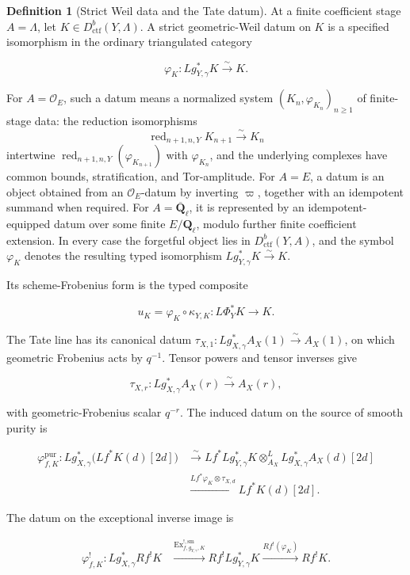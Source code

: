 \documentclass[10pt]{article}
\theoremstyle{definition}
\newtheorem{definition}[theorem]{Definition}
\newcommand{\Ql}{\mathbf Q_\ell}
\newcommand{\Qlb}{\overline{\mathbf Q}_\ell}
\newcommand{\OO}{\mathcal O}
\newcommand{\Dctf}{D^b_{\mathrm{ctf}}}
\newcommand{\red}{\operatorname{red}}
\begin{document}
\begin{definition}[Strict Weil data and the Tate datum]
At a finite coefficient stage \(A=\Lambda\), let
\(K\in\Dctf(Y,\Lambda)\).  A strict geometric-Weil datum on \(K\) is a
specified isomorphism in the ordinary triangulated category

\[
 \varphi_K:Lg_{Y,\gamma}^*K\xrightarrow{\sim}K.
\]

For \(A=\OO_E\), such a datum means a normalized system
\((K_n,\varphi_{K_n})_{n\geq1}\) of finite-stage data: the reduction
isomorphisms
\[
 \red_{n+1,n,Y}K_{n+1}\xrightarrow{\sim}K_n
\]
intertwine \(\red_{n+1,n,Y}(\varphi_{K_{n+1}})\) with
\(\varphi_{K_n}\), and the underlying complexes have common bounds,
stratification, and Tor-amplitude.  For \(A=E\), a datum is an object obtained
from an \(\OO_E\)-datum by inverting \(\varpi\), together with an idempotent
summand when required.  For \(A=\Qlb\), it is represented by an
idempotent-equipped datum over some finite \(E/\Ql\), modulo further finite
coefficient extension.  In every case the forgetful object lies in
\(\Dctf(Y,A)\), and the symbol \(\varphi_K\) denotes the resulting typed
isomorphism \(Lg_{Y,\gamma}^*K\xrightarrow{\sim}K\).

Its scheme-Frobenius form is the typed composite

\[
 u_K=\varphi_K\circ\kappa_{Y,K}:
 L\Phi_Y^*K\longrightarrow K.
\]

The Tate line has its canonical datum
\(\tau_{X,1}:Lg_{X,\gamma}^*A_X(1)\xrightarrow{\sim}A_X(1)\), on which
geometric Frobenius acts by \(q^{-1}\).  Tensor powers and tensor inverses
give

\[
 \tau_{X,r}:Lg_{X,\gamma}^*A_X(r)\xrightarrow{\sim}A_X(r),
\]

with geometric-Frobenius scalar \(q^{-r}\).  The induced datum on the
source of smooth purity is

\[
\begin{aligned}
 \varphi^{\mathrm{pur}}_{f,K}:
 Lg_{X,\gamma}^*\bigl(Lf^*K(d)[2d]\bigr)
 &\xrightarrow{\sim}
 Lf^*Lg_{Y,\gamma}^*K\otimes_{A_X}^L
 Lg_{X,\gamma}^*A_X(d)[2d]\\
 &\xrightarrow{Lf^*\varphi_K\otimes\tau_{X,d}}
 Lf^*K(d)[2d].
\end{aligned}
\]

The datum on the exceptional inverse image is

\[
\begin{aligned}
 \varphi^!_{f,K}:Lg_{X,\gamma}^*Rf^!K
 &\xrightarrow{\operatorname{Ex}^{!,\mathrm{sm}}_{f,g_{Y,\gamma},K}}
 Rf^!Lg_{Y,\gamma}^*K
 \xrightarrow{Rf^!(\varphi_K)}Rf^!K.
\end{aligned}
\]
\end{definition}
\end{document}
